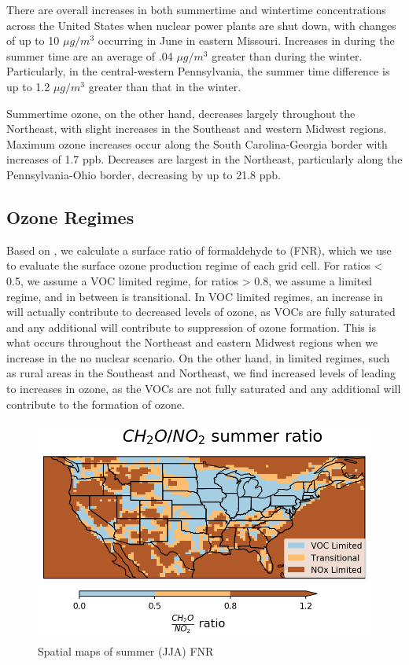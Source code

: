 \documentclass[12]{article}
\begin{document}
There are overall increases in both summertime and wintertime  concentrations across the United States when nuclear power plants are shut down, with changes of up to 10 $\mu g/m^3$ occurring in June in eastern Missouri. Increases in  during the summer time are an average of .04 $\mu g/m^3$ greater than during the winter. Particularly, in the central-western Pennsylvania, the summer time  difference is up to 1.2 $\mu g/m^3$ greater than that in the winter. 

Summertime ozone, on the other hand, decreases largely throughout the Northeast, with slight increases in the Southeast and western Midwest regions. Maximum ozone increases occur along the South Carolina-Georgia border with increases of 1.7 ppb. Decreases are largest in the Northeast, particularly along the Pennsylvania-Ohio border, decreasing by up to 21.8 ppb. 

\subsection{Ozone Regimes}
Based on \cite{jin_evaluating_2017}, we calculate a surface ratio of formaldehyde to  (FNR), which we use to evaluate the surface ozone production regime of each grid cell. For ratios < 0.5, we assume a VOC limited regime, for ratios > 0.8, we assume a  limited regime, and in between is transitional. In VOC limited regimes, an increase in  will actually contribute to decreased levels of ozone, as VOCs are fully saturated and any additional  will contribute to suppression of ozone formation. This is what occurs throughout the Northeast and eastern Midwest regions when we increase  in the no nuclear scenario. On the other hand, in  limited regimes, such as rural areas in the Southeast and Northeast, we find increased levels of  leading to increases in ozone, as the VOCs are not fully saturated and any additional  will contribute to the formation of ozone.  

\begin{figure}
    \centering
    \includegraphics[scale=0.4]{ego_nonuclear_project/Figures/summer_regime_national_ratio.png}
    \caption{Spatial maps of summer (JJA) FNR} 
    \label{fig:summer_FNR}
\end{figure}
\end{document}
